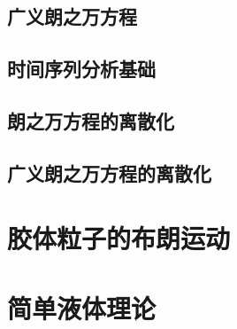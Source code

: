 \documentclass[zihao=-4,linespread=1.5,a4paper,heading=true,twoside]{ctexbook}
\theoremstyle{definition}
\theoremstyle{plain}
\begin{document}
\chapter{广义朗之万方程}

\chapter{时间序列分析基础}
\chapter{朗之万方程的离散化}
\chapter{广义朗之万方程的离散化}

\part{胶体粒子的布朗运动}

\part{简单液体理论}
\end{document}
